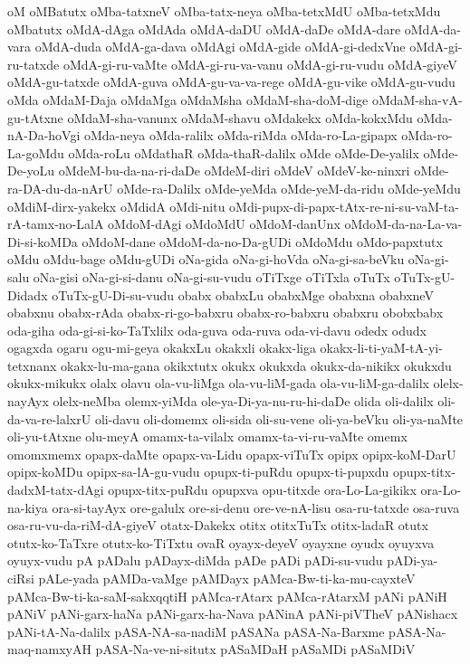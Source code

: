 {oM
oMBatutx
oMba-tatxneV
oMba-tatx-neya
oMba-tetxMdU
oMba-tetxMdu
oMbatutx
oMdA-dAga
oMdAda
oMdA-daDU
oMdA-daDe
oMdA-dare
oMdA-da-vara
oMdA-duda
oMdA-ga-dava
oMdAgi
oMdA-gide
oMdA-gi-dedxVne
oMdA-gi-ru-tatxde
oMdA-gi-ru-vaMte
oMdA-gi-ru-va-vanu
oMdA-gi-ru-vudu
oMdA-giyeV
oMdA-gu-tatxde
oMdA-guva
oMdA-gu-va-va-rege
oMdA-gu-vike
oMdA-gu-vudu
oMda
oMdaM-Daja
oMdaMga
oMdaMsha
oMdaM-sha-doM-dige
oMdaM-sha-vA-gu-tAtxne
oMdaM-sha-vanunx
oMdaM-shavu
oMdakekx
oMda-kokxMdu
oMda-nA-Da-hoVgi
oMda-neya
oMda-ralilx
oMda-riMda
oMda-ro-La-gipapx
oMda-ro-La-goMdu
oMda-roLu
oMdathaR
oMda-thaR-dalilx
oMde
oMde-De-yalilx
oMde-De-yoLu
oMdeM-bu-da-na-ri-daDe
oMdeM-diri
oMdeV
oMdeV-ke-ninxri
oMde-ra-DA-du-da-nArU
oMde-ra-Dalilx
oMde-yeMda
oMde-yeM-da-ridu
oMde-yeMdu
oMdiM-dirx-yakekx
oMdidA
oMdi-nitu
oMdi-pupx-di-papx-tAtx-re-ni-su-vaM-ta-rA-tamx-no-LalA
oMdoM-dAgi
oMdoMdU
oMdoM-danUnx
oMdoM-da-na-La-va-Di-si-koMDa
oMdoM-dane
oMdoM-da-no-Da-gUDi
oMdoMdu
oMdo-papxtutx
oMdu
oMdu-bage
oMdu-gUDi
oNa-gida
oNa-gi-hoVda
oNa-gi-sa-beVku
oNa-gi-salu
oNa-gisi
oNa-gi-si-danu
oNa-gi-su-vudu
oTiTxge
oTiTxla
oTuTx
oTuTx-gU-Didadx
oTuTx-gU-Di-su-vudu
obabx
obabxLu
obabxMge
obabxna
obabxneV
obabxnu
obabx-rAda
obabx-ri-go-babxru
obabx-ro-babxru
obabxru
obobxbabx
oda-giha
oda-gi-si-ko-TaTxlilx
oda-guva
oda-ruva
oda-vi-davu
odedx
odudx
ogagxda
ogaru
ogu-mi-geya
okakxLu
okakxli
okakx-liga
okakx-li-ti-yaM-tA-yi-tetxnanx
okakx-lu-ma-gana
okikxtutx
okukx
okukxda
okukx-da-nikikx
okukxdu
okukx-mikukx
olalx
olavu
ola-vu-liMga
ola-vu-liM-gada
ola-vu-liM-ga-dalilx
olelx-nayAyx
olelx-neMba
olemx-yiMda
ole-ya-Di-ya-nu-ru-hi-daDe
olida
oli-dalilx
oli-da-va-re-lalxrU
oli-davu
oli-domemx
oli-sida
oli-su-vene
oli-ya-beVku
oli-ya-naMte
oli-yu-tAtxne
olu-meyA
omamx-ta-vilalx
omamx-ta-vi-ru-vaMte
omemx
omomxmemx
opapx-daMte
opapx-va-Lidu
opapx-viTuTx
opipx
opipx-koM-DarU
opipx-koMDu
opipx-sa-lA-gu-vudu
opupx-ti-puRdu
opupx-ti-pupxdu
opupx-titx-dadxM-tatx-dAgi
opupx-titx-puRdu
opupxva
opu-titxde
ora-Lo-La-gikikx
ora-Lo-na-kiya
ora-si-tayAyx
ore-galulx
ore-si-denu
ore-ve-nA-lisu
osa-ru-tatxde
osa-ruva
osa-ru-vu-da-riM-dA-giyeV
otatx-Dakekx
otitx
otitxTuTx
otitx-ladaR
otutx
otutx-ko-TaTxre
otutx-ko-TiTxtu
ovaR
oyayx-deyeV
oyayxne
oyudx
oyuyxva
oyuyx-vudu
pA
pADalu
pADayx-diMda
pADe
pADi
pADi-su-vudu
pADi-ya-ciRsi
pALe-yada
pAMDa-vaMge
pAMDayx
pAMca-Bw-ti-ka-mu-cayxteV
pAMca-Bw-ti-ka-saM-sakxqqtiH
pAMca-rAtarx
pAMca-rAtarxM
pANi
pANiH
pANiV
pANi-garx-haNa
pANi-garx-ha-Nava
pANinA
pANi-piVTheV
pANishacx
pANi-tA-Na-dalilx
pASA-NA-sa-nadiM
pASANa
pASA-Na-Barxme
pASA-Na-maq-namxyAH
pASA-Na-ve-ni-situtx
pASaMDaH
pASaMDi
pASaMDiV
}

